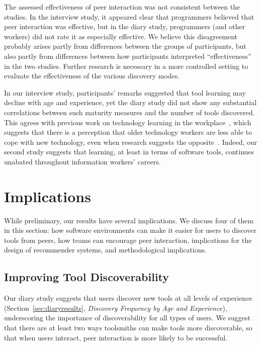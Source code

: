 \documentclass[smallextended]{svjour3}
\newcommand\discovery{peer interaction\xspace}
\begin{document}
The assessed effectiveness of \discovery was not consistent between the studies.
In the interview study, it appeared clear that programmers believed that
\discovery was effective, but in the diary study, 
programmers (and other workers) did not rate it as especially effective. 
We believe this disagreement probably arises partly from differences
between the groups of participants, but also partly from differences between
how participants interpreted ``effectiveness'' in the two studies.
Further research is necessary in a more controlled setting to evaluate
the effectiveness of the various discovery modes.

In our interview study, participants' remarks suggested that tool learning may decline with
age and experience, yet the diary study did not show any substantial 
correlations between such maturity measures and the number of tools discovered.
This agrees with previous work on technology learning in the workplace~\cite{brooke},
which suggests that there is a perception that older technology workers
are less able to cope with new technology, even when research suggests
the opposite~\cite{morrison}.
Indeed, our second study suggests that learning, at least in terms of software tools,
continues unabated throughout information workers' careers.

\section{Implications}\label{sec:discussion}

\noindent
While preliminary, our results have several implications.
We discuss four of them in this section: how software
environments can make it easier for users to discover tools from peers,
how teams can encourage \discovery,
implications for the design of recommender systems,
and methodological implications.

\subsection{Improving Tool Discoverability}\label{sec:discoverability}

\noindent
Our diary study suggests that users discover new tools 
at all levels of experience (Section~\ref{sec:diaryresults}, \textit{Discovery Frequency by Age and Experience}), 
underscoring the importance of discoverability for all types of users.
We suggest that there are at least two ways toolsmiths can make
tools more discoverable, so that when users interact, \discovery is 
more likely to be successful.
\end{document}
